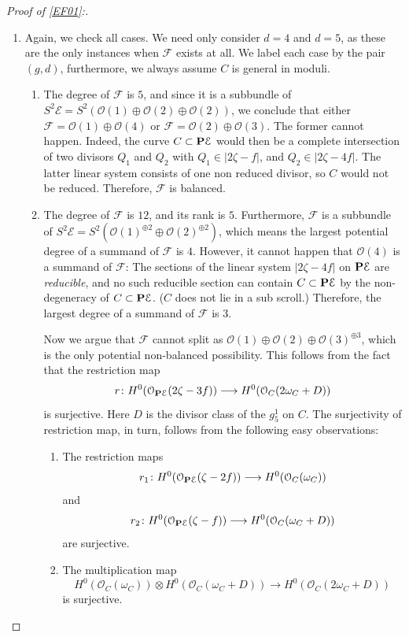 \documentclass[reqno, 10 pt]{article}
\theoremstyle{definition}
\theoremstyle{remark}
\numberwithin{equation}{section}
\numberwithin{thm}{section}
\numberwithin{prop}{section}
\numberwithin{lem}{section}
\numberwithin{cor}{section}
\numberwithin{conj}{section}
\numberwithin{defn}{section}
\renewcommand{\to}{\longrightarrow}
\newcommand{\cE}{{\mathcal E}}
\newcommand{\cF}{{\mathcal F}}
\newcommand{\cO}{{\mathcal O}}
\renewcommand{\P}{{\bf P}}
\newcommand {\from}{{\colon}}
\begin{document}
\begin{proof}[Proof of \autoref{EF01}:]
\begin{enumerate}
\begin{enumerate}
Since the domain of this restriction map is independent of the parameter $s$, we conclude that $\cF_{\beta}$ must be {\sl perfectly} balanced.  Then, for degree reasons, we conclude $(d)$. 
\end{enumerate}
\item Again, we check all cases.  We need only consider $d=4$ and $d=5$, as these are the only instances when $\cF$ exists at all.  We label each case by the pair $(g,d)$, furthermore, we always assume $C$ is general in moduli.
\begin{enumerate}
\item[$(2, 4)$:] The degree of $\cF$ is $5$, and since it is a subbundle of $S^2 \cE = S^2 (\cO(1) \oplus \cO(2) \oplus \cO(2))$, we conclude that either $\cF = \cO(1) \oplus \cO(4)$ or $\cF = \cO(2) \oplus \cO(3)$.  The former cannot happen. Indeed, the curve $C \subset \P \cE$ would then be a complete intersection of two divisors $Q_{1}$ and $Q_{2}$ with $Q_{1} \in |2\zeta - f|$, and $Q_{2} \in |2\zeta - 4f|$.  The latter linear system consists of one non reduced divisor, so $C$ would not be reduced. Therefore, $\cF$ is balanced.

\item[$(2,5)$:] The degree of $\cF$ is $12$, and its rank is $5$.  Furthermore, $\cF$ is a subbundle of $S^2 \cE = S^2 (\cO(1)^{\oplus 2}  \oplus \cO(2)^{\oplus 2})$, which means the largest potential degree of a summand of $\cF$ is $4$.  However, it cannot happen that $\cO(4)$ is a summand of $\cF$: The sections of the linear system $|2\zeta - 4f|$ on $\P \cE$ are {\sl reducible}, and no such reducible section can contain $C \subset \P \cE$ by the non-degeneracy of $C \subset \P \cE$. ($C$ does not lie in a sub scroll.) Therefore, the largest degree of a summand of $\cF$ is $3$. 


Now we argue that $\cF$ cannot split as $\cO(1) \oplus \cO(2) \oplus \cO(3)^{\oplus 3}$, which is the only potential non-balanced possibility.  This follows from the fact that the restriction map \[r \from H^0(\cO_{\P \cE}(2\zeta - 3f)) \to H^{0}(\cO_{C}(2\omega_{C}+D)) \] is surjective. Here $D$ is the divisor class of the $g^{1}_{5}$ on $C$.  The surjectivity of restriction map, in turn, follows from the following easy observations:

\begin{enumerate}
\item The restriction maps $$r_{1} \from H^0(\cO_{\P \cE}(\zeta - 2f)) \to H^{0}(\cO_{C}(\omega_{C}))$$ and $$r_{2} \from H^0(\cO_{\P \cE}(\zeta - f)) \to H^{0}(\cO_{C}(\omega_{C} + D))$$ are surjective.
\item The multiplication map $$H^{0}(\cO_{C}(\omega_{C})) \otimes H^{0}(\cO_{C}(\omega_{C} +D)) \to H^{0}(\cO_{C}(2\omega_{C}+D))$$ is surjective.
\end{enumerate}


\end{enumerate}
\end{enumerate}
\end{proof}
\end{document}
